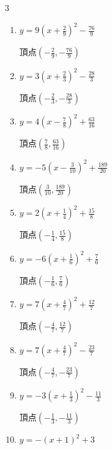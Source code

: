 \begin{multicols}{3}
\begin{enumerate}
        $\displaystyle 頂点\left( 1 , -6 \right)$

  \item $\displaystyle y=9\left( x+\frac{2}{9}\right)^{2}-\frac{76}{9}$

        $\displaystyle 頂点\left( -\frac{2}{9} , -\frac{76}{9} \right)$

  \item $\displaystyle y=3\left( x+\frac{2}{3}\right)^{2}-\frac{28}{3}$

        $\displaystyle 頂点\left( -\frac{2}{3} , -\frac{28}{3} \right)$

  \item $\displaystyle y=4\left( x-\frac{7}{8}\right)^{2}+\frac{63}{16}$

        $\displaystyle 頂点\left( \frac{7}{8} , \frac{63}{16} \right)$

  \item $\displaystyle y=-5\left( x-\frac{3}{10}\right)^{2}+\frac{189}{20}$

        $\displaystyle 頂点\left( \frac{3}{10} , \frac{189}{20} \right)$

  \item $\displaystyle y=2\left( x+\frac{1}{4}\right)^{2}+\frac{15}{8}$

        $\displaystyle 頂点\left( -\frac{1}{4} , \frac{15}{8} \right)$

\columnbreak %

\resetques

  \item $\displaystyle y=-6\left( x+\frac{1}{6}\right)^{2}+\frac{7}{6}$

        $\displaystyle 頂点\left( -\frac{1}{6} , \frac{7}{6} \right)$

  \item $\displaystyle y=7\left( x+\frac{4}{7}\right)^{2}+\frac{12}{7}$

        $\displaystyle 頂点\left( -\frac{4}{7} , \frac{12}{7} \right)$

  \item $\displaystyle y=7\left( x+\frac{4}{7}\right)^{2}-\frac{23}{7}$

        $\displaystyle 頂点\left( -\frac{4}{7} , -\frac{23}{7} \right)$

  \item $\displaystyle y=-3\left( x+\frac{1}{3}\right)^{2}-\frac{11}{3}$

        $\displaystyle 頂点\left( -\frac{1}{3} , -\frac{11}{3} \right)$

  \item $\displaystyle y=-\left( x+1\right)^{2}+3$


\end{enumerate}
\end{multicols}
